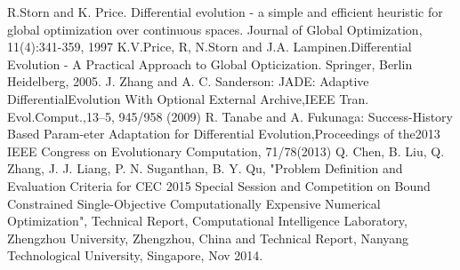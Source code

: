 \documentclass[a4paper,11pt,oneside,openany]{jsbook}
\begin{document}
\begin{thebibliography}{10}
 R.Storn and K. Price. Differential evolution - a simple and efficient heuristic for global optimization over continuous spaces. Journal of Global Optimization, 11(4):341-359, 1997 
  K.V.Price, R, N.Storn and J.A. Lampinen.Differential Evolution - A Practical Approach to Global Opticization. Springer, Berlin Heidelberg, 2005.
  J. Zhang and A. C. Sanderson: JADE: Adaptive DifferentialEvolution With Optional External Archive,IEEE Tran. Evol.Comput.,13–5, 945/958 (2009)
  R. Tanabe and A. Fukunaga: Success-History Based Param-eter Adaptation for Differential Evolution,Proceedings of the2013 IEEE Congress on Evolutionary Computation, 71/78(2013)
  Q. Chen, B. Liu,  Q. Zhang, J. J. Liang, P. N. Suganthan, B. Y. Qu, "Problem Definition and Evaluation Criteria for CEC 2015 Special Session and Competition on Bound Constrained Single-Objective Computationally Expensive Numerical Optimization", Technical Report, Computational Intelligence Laboratory, Zhengzhou University, Zhengzhou, China  and  Technical Report, Nanyang Technological University, Singapore, Nov 2014.

\end{thebibliography}
\end{document}
